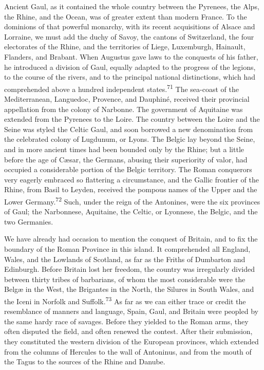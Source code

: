 Ancient Gaul, as it contained the whole country between the
Pyrenees, the Alps, the Rhine, and the Ocean, was of greater
extent than modern France. To the dominions of that powerful
monarchy, with its recent acquisitions of Alsace and Lorraine, we
must add the duchy of Savoy, the cantons of Switzerland, the four
electorates of the Rhine, and the territories of Liege,
Luxemburgh, Hainault, Flanders, and Brabant. When Augustus gave
laws to the conquests of his father, he introduced a division of
Gaul, equally adapted to the progress of the legions, to the
course of the rivers, and to the principal national distinctions,
which had comprehended above a hundred independent states.\textsuperscript{71} The
sea-coast of the Mediterranean, Languedoc, Provence, and
Dauphiné, received their provincial appellation from the colony
of Narbonne. The government of Aquitaine was extended from the
Pyrenees to the Loire. The country between the Loire and the
Seine was styled the Celtic Gaul, and soon borrowed a new
denomination from the celebrated colony of Lugdunum, or Lyons.
The Belgic lay beyond the Seine, and in more ancient times had
been bounded only by the Rhine; but a little before the age of
Cæsar, the Germans, abusing their superiority of valor, had
occupied a considerable portion of the Belgic territory. The
Roman conquerors very eagerly embraced so flattering a
circumstance, and the Gallic frontier of the Rhine, from Basil to
Leyden, received the pompous names of the Upper and the Lower
Germany.\textsuperscript{72} Such, under the reign of the Antonines, were the six
provinces of Gaul; the Narbonnese, Aquitaine, the Celtic, or
Lyonnese, the Belgic, and the two Germanies.



We have already had occasion to mention the conquest of Britain,
and to fix the boundary of the Roman Province in this island. It
comprehended all England, Wales, and the Lowlands of Scotland, as
far as the Friths of Dumbarton and Edinburgh. Before Britain lost
her freedom, the country was irregularly divided between thirty
tribes of barbarians, of whom the most considerable were the
Belgæ in the West, the Brigantes in the North, the Silures in
South Wales, and the Iceni in Norfolk and Suffolk.\textsuperscript{73} As far as
we can either trace or credit the resemblance of manners and
language, Spain, Gaul, and Britain were peopled by the same hardy
race of savages. Before they yielded to the Roman arms, they
often disputed the field, and often renewed the contest. After
their submission, they constituted the western division of the
European provinces, which extended from the columns of Hercules
to the wall of Antoninus, and from the mouth of the Tagus to the
sources of the Rhine and Danube.

